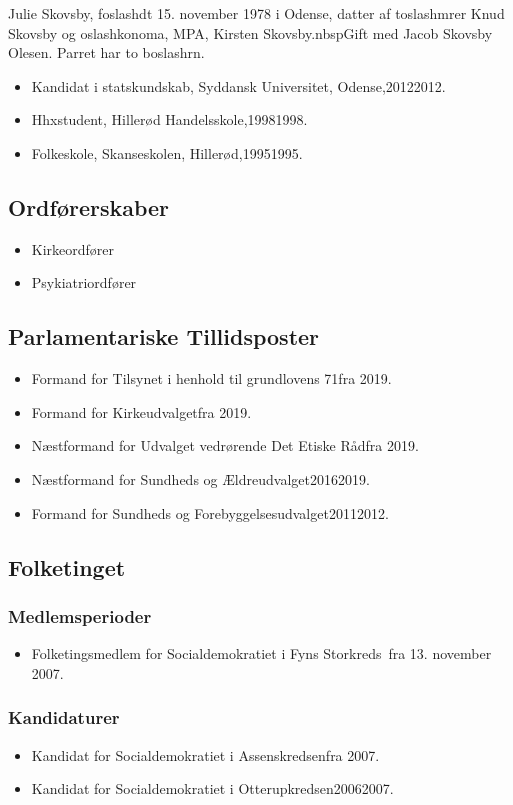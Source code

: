 \documentclass[11pt, a4paper]{awesome-cv}
\begin{document}
\makecvheader[R]
\makelettertitle
\begin{cvletter}
Julie Skovsby, foslashdt 15. november 1978 i Odense, datter af toslashmrer Knud Skovsby og oslashkonoma, MPA, Kirsten Skovsby.nbspGift med Jacob Skovsby Olesen. Parret har to boslashrn.

\begin{itemize}
\item Kandidat i statskundskab, Syddansk Universitet, Odense,20122012.
\item Hhxstudent, Hillerød Handelsskole,19981998.
\item Folkeskole, Skanseskolen, Hillerød,19951995.
\end{itemize}
\subsection*{Ordførerskaber}
\begin{itemize}
\item Kirkeordfører
\item Psykiatriordfører
\end{itemize}
\subsection*{Parlamentariske Tillidsposter}
\begin{itemize}
\item Formand for Tilsynet i henhold til grundlovens  71fra 2019.
\item Formand for Kirkeudvalgetfra 2019.
\item Næstformand for Udvalget vedrørende Det Etiske Rådfra 2019.
\item Næstformand for Sundheds og Ældreudvalget20162019.
\item Formand for Sundheds og Forebyggelsesudvalget20112012.
\end{itemize}
\subsection*{Folketinget}
\subsubsection*{Medlemsperioder}
\begin{itemize}
\item Folketingsmedlem for Socialdemokratiet i Fyns Storkreds fra 13. november 2007.
\end{itemize}
\subsubsection*{Kandidaturer}
\begin{itemize}
\item Kandidat for Socialdemokratiet i Assenskredsenfra 2007.
\item Kandidat for Socialdemokratiet i Otterupkredsen20062007.
\end{itemize}
\end{cvletter}
\end{document}
